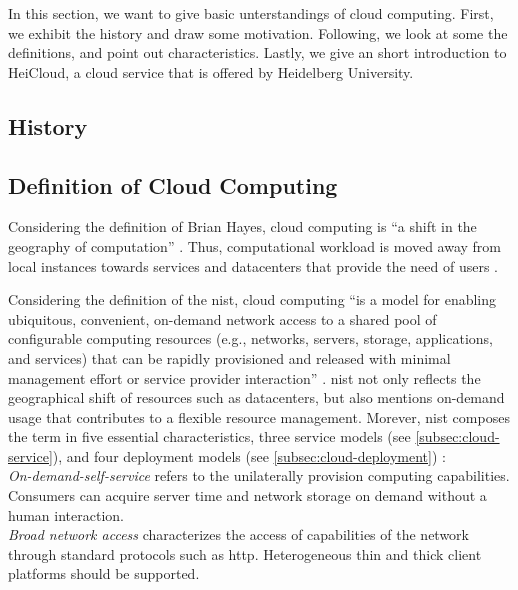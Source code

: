 In this section, we want to give basic unterstandings of cloud computing. First, we exhibit the history and draw some motivation. Following, we look at some the definitions, and point out characteristics. Lastly, we give an short introduction to HeiCloud, a cloud service that is offered by Heidelberg University.

\subsection{History}


\subsection{Definition of Cloud Computing}

Considering the definition of Brian Hayes, cloud computing is \enquote{a shift in the geography of computation} \cite{hayes2008}. Thus, computational workload is moved away from local instances towards services and datacenters that provide the need of users \cite{Armbrust2010}.

Considering the definition of the \ac{nist}, cloud computing \enquote{is a model for enabling ubiquitous, convenient, on-demand network access to a shared pool of configurable computing resources (e.g., networks, servers, storage, applications, and services) that can be rapidly provisioned and released with minimal management effort or service provider interaction} \cite{Mell2011}. \ac{nist} not only reflects the geographical shift of resources such as datacenters, but also mentions on-demand usage that contributes to a flexible resource management. Morever, \ac{nist} composes the term in five essential characteristics, three service models (see \autoref{subsec:cloud-service}), and four deployment models (see \autoref{subsec:cloud-deployment}) \cite{Mell2011}:\\

\textit{On-demand-self-service} refers to the unilaterally provision computing capabilities. Consumers can acquire server time and network storage on demand without a human interaction.\\

\textit{Broad network access} characterizes the access of capabilities of the network through standard protocols such as \ac{http}. Heterogeneous thin and thick client platforms should be supported.\\

